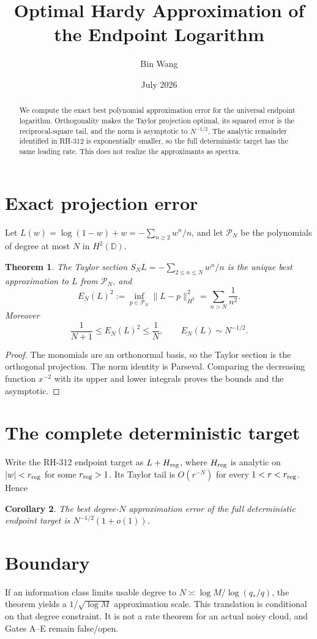 \documentclass[11pt]{article}
\title{Optimal Hardy Approximation of the Endpoint Logarithm}
\author{Bin Wang}\date{July 2026}
\newtheorem{theorem}{Theorem}[section]
\newtheorem{corollary}[theorem]{Corollary}
\theoremstyle{remark}\newtheorem{remark}[theorem]{Remark}
\begin{document}
\maketitle
\begin{abstract}
We compute the exact best polynomial approximation error for the universal
endpoint logarithm.  Orthogonality makes the Taylor projection optimal, its
squared error is the reciprocal-square tail, and the norm is asymptotic to
$N^{-1/2}$.  The analytic remainder identified in RH-312 is exponentially
smaller, so the full deterministic target has the same leading rate.  This
does not realize the approximants as spectra.
\end{abstract}

\section{Exact projection error}
Let $L(w)=\log(1-w)+w=-\sum_{n\ge2}w^n/n$, and let $\mathcal P_N$ be the
polynomials of degree at most $N$ in $H^2(\mathbb D)$.
\begin{theorem}
The Taylor section $S_NL=-\sum_{2\le n\le N}w^n/n$ is the unique best
approximation to $L$ from $\mathcal P_N$, and
\[
 E_N(L)^2:=\inf_{p\in\mathcal P_N}\|L-p\|_{H^2}^2
 =\sum_{n>N}\frac1{n^2}.
\]
Moreover
\[
 \frac1{N+1}\le E_N(L)^2\le\frac1N,
 \qquad E_N(L)\sim N^{-1/2}.
\]
\end{theorem}
\begin{proof}
The monomials are an orthonormal basis, so the Taylor section is the
orthogonal projection.  The norm identity is Parseval.  Comparing the
decreasing function $x^{-2}$ with its upper and lower integrals proves the
bounds and the asymptotic.
\end{proof}

\section{The complete deterministic target}
Write the RH-312 endpoint target as $L+H_{\rm reg}$, where
$H_{\rm reg}$ is analytic on $|w|<r_{\rm reg}$ for some $r_{\rm reg}>1$.
Its Taylor tail is $O(r^{-N})$ for every $1<r<r_{\rm reg}$.  Hence
\begin{corollary}
The best degree-$N$ approximation error of the full deterministic endpoint
target is $N^{-1/2}(1+o(1))$.
\end{corollary}

\section{Boundary}
If an information class limits usable degree to
$N\asymp\log M/\log(q_*/q)$, the theorem yields a
$1/\sqrt{\log M}$ approximation scale.  This translation is conditional on
that degree constraint.  It is not a rate theorem for an actual noisy cloud,
and Gates A--E remain false/open.
\end{document}
